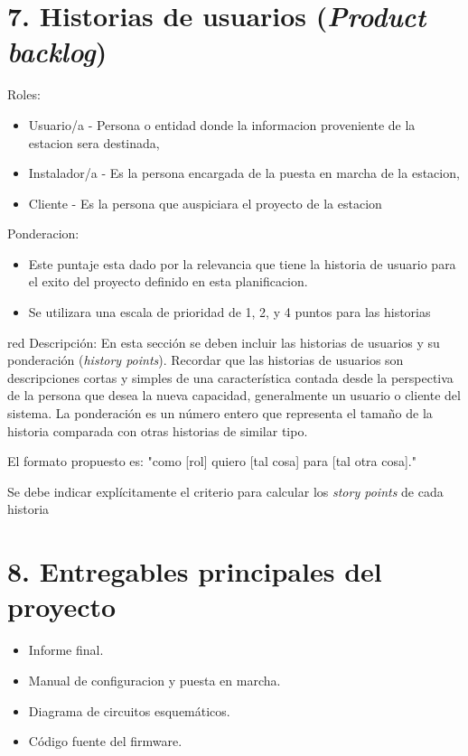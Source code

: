 \documentclass[
11pt, %
codirector, %
]{charter}
\begin{document}
\section{7. Historias de usuarios (\textit{Product backlog})}
\label{sec:backlog}

Roles: 
\begin{itemize}
	\item Usuario/a - Persona o entidad donde la informacion proveniente de la estacion sera destinada, 
	\item Instalador/a - Es la persona encargada de la puesta en marcha de la estacion, 
	\item Cliente - Es la persona que auspiciara el proyecto de la estacion
\end{itemize}

Ponderacion:
	\begin{itemize}
		\item Este puntaje esta dado por la relevancia que tiene la historia de usuario para el exito del proyecto definido en esta planificacion.
		\item Se utilizara una escala de prioridad de 1, 2, y 4 puntos para las historias
	\end{itemize}

\begin{consigna}{red}
Descripción: En esta sección se deben incluir las historias de usuarios y su ponderación (\textit{history points}). Recordar que las historias de usuarios son descripciones cortas y simples de una característica contada desde la perspectiva de la persona que desea la nueva capacidad, generalmente un usuario o cliente del sistema. La ponderación es un número entero que representa el tamaño de la historia comparada con otras historias de similar tipo.

El formato propuesto es: "como [rol] quiero [tal cosa] para [tal otra cosa]."

Se debe indicar explícitamente el criterio para calcular los \textit{story points} de cada historia
\end{consigna}

\section{8. Entregables principales del proyecto}
\label{sec:entregables}

\begin{itemize}
	\item Informe final.
	\item Manual de configuracion y puesta en marcha.
	\item Diagrama de circuitos esquemáticos.
	\item Código fuente del firmware.
\end{itemize}
\end{document}

